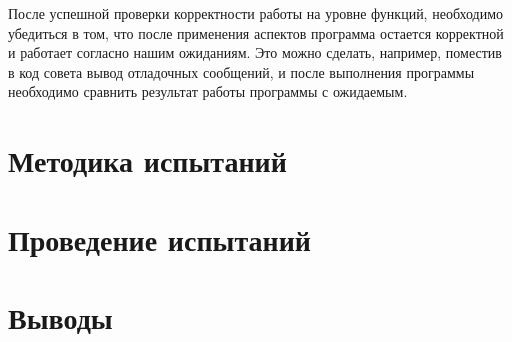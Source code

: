 После успешной проверки корректности работы на уровне функций, необходимо
убедиться в том, что после применения аспектов программа остается корректной
и работает согласно нашим ожиданиям.
Это можно сделать, например, поместив в код совета вывод отладочных сообщений,
и после выполнения программы необходимо сравнить результат работы программы с 
ожидаемым.
\section{Методика испытаний}
\label{sec:testing_methodology}
\section{Проведение испытаний}
\label{sec:testing_run}
\section{Выводы}
\label{sec:ch5_conclusion}
